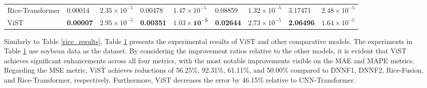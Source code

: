 \documentclass[acmsmall, screen]{acmart}
\begin{document}
\begin{table}[htbp]
{\begin{tabular}{lllllllll}
      Rice-Transformer & 0.00014 & \begin{math}2.35\times 10^{-5}\end{math} & 0.00478 & \begin{math}1.47\times 10^{-5}\end{math} & 0.08859 & \begin{math}1.32\times 10^{-5}\end{math} & 3.17471 & \begin{math}2.48\times 10^{-5}\end{math} \\
      ViST  & \textbf{0.00007} & \begin{math}2.95\times 10^{-5}\end{math} & \textbf{0.00351} & \begin{math}\mathbf{1.03\times 10^{-5}}\end{math} & \textbf{0.02644} & \begin{math}2.73\times 10^{-5}\end{math} & \textbf{2.06496} & \begin{math}1.64\times 10^{-5}\end{math} \\
      \bottomrule
      \end{tabular}%
  }
    
    \label{soybean_results}%
\end{table}%


Similarly to Table \ref{rice_results}, Table \ref{soybean_results} presents the experimental results of ViST and other comparative models. The experiments in Table \ref{soybean_results} use soybean data as the dataset. By considering the improvement ratios relative to the other models, it is evident that ViST achieves significant enhancements across all four metrics, with the most notable improvements visible on the MAE and MAPE metrics. Regarding the MSE metric, ViST achieves reductions of 56.25\%, 92.31\%, 61.11\%, and 50.00\% compared to DNNF1, DNNF2, Rice-Fusion, and Rice-Transformer, respectively. Furthermore, ViST decreases the error by 46.15\% relative to CNN-Transformer.
\end{document}
